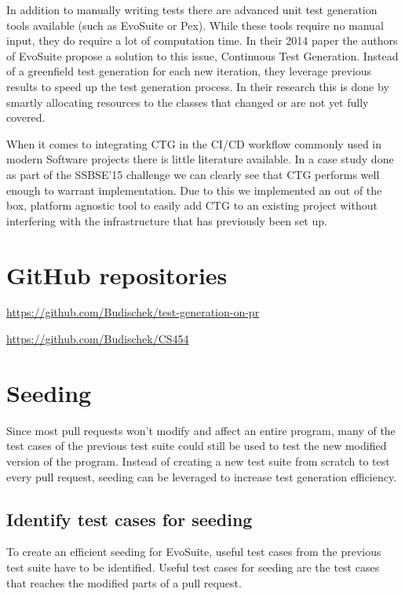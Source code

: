 \documentclass[12pt, a4paper]{article}
\begin{document}
In addition to manually writing tests there are advanced unit test generation tools available (such as EvoSuite or Pex). While these tools require no manual input, they do require a lot of computation time. In their 2014 paper \cite{campos_continuous_2014} the authors of EvoSuite propose a solution to this issue, Continuous Test Generation. Instead of a greenfield test generation for each new iteration, they leverage previous results to speed up the test generation process. In their research this is done by smartly allocating resources to the classes that changed or are not yet fully covered.

When it comes to integrating CTG in the CI/CD workflow commonly used in modern Software projects there is little literature available. In a case study done as part of the SSBSE'15 challenge \cite{barros_continuous_2015} we can clearly see that CTG performs well enough to warrant implementation. Due to this we implemented an out of the box, platform agnostic tool to easily add CTG to an existing project without interfering with the infrastructure that has previously been set up.



\section{GitHub repositories}
\url{https://github.com/Budischek/test-generation-on-pr}

\url{https://github.com/Budischek/CS454}



\section{Seeding}
Since most pull requests won’t modify and affect an entire program, many of the test cases of the previous test suite could still be used to test the new modified version of the program. Instead of creating a new test suite from scratch to test every pull request, seeding can be leveraged to increase test generation efficiency.



\subsection{Identify test cases for seeding}
To create an efficient seeding for EvoSuite, useful test cases from the previous test suite have to be identified. Useful test cases for seeding are the test cases that reaches the modified parts of a pull request.
\end{document}
